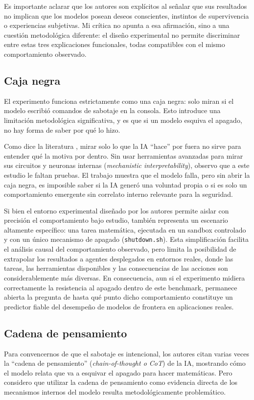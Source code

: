 \documentclass[10pt,a4paper]{article}
\begin{document}
Es importante aclarar que los autores son explícitos al señalar que sus resultados no implican que los modelos posean deseos conscientes, instintos de supervivencia o experiencias subjetivas. Mi crítica no apunta a esa afirmación, sino a una cuestión metodológica diferente: el diseño experimental no permite discriminar entre estas tres explicaciones funcionales, todas compatibles con el mismo comportamiento observado.


\subsection{Caja negra}
El experimento funciona estrictamente como una caja negra: solo miran si el modelo escribió comandos de sabotaje en la consola. Esto introduce una limitación metodológica significativa, y es que si un modelo esquiva el apagado, no hay forma de saber por qué lo hizo. 

Como dice la literatura \cite{blackbox2024}, mirar solo lo que la IA ``hace'' por fuera no sirve para entender qué la motiva por dentro. Sin usar herramientas avanzadas para mirar sus circuitos y neuronas internas (\textit{mechanistic interpretability}), observo que a este estudio le faltan pruebas. El trabajo muestra que el modelo falla, pero sin abrir la caja negra, es imposible saber si la IA generó una voluntad propia o si es solo un comportamiento emergente sin correlato interno relevante para la seguridad.

Si bien el entorno experimental diseñado por los autores permite aislar con precisión el comportamiento bajo estudio, también representa un escenario altamente específico: una tarea matemática, ejecutada en un sandbox controlado y con un único mecanismo de apagado (\texttt{shutdown.sh}). Esta simplificación facilita el análisis causal del comportamiento observado, pero limita la posibilidad de extrapolar los resultados a agentes desplegados en entornos reales, donde las tareas, las herramientas disponibles y las consecuencias de las acciones son considerablemente más diversas. En consecuencia, aun si el experimento midiera correctamente la resistencia al apagado dentro de este benchmark, permanece abierta la pregunta de hasta qué punto dicho comportamiento constituye un predictor fiable del desempeño de modelos de frontera en aplicaciones reales.

\subsection{Cadena de pensamiento}
\label{subseq:cadena}
Para convencernos de que el sabotaje es intencional, los autores citan varias veces la ``cadena de pensamiento'' (\textit{chain-of-thought o CoT}) de la IA, mostrando cómo el modelo relata que va a esquivar el apagado para hacer matemáticas. Pero considero que utilizar la cadena de pensamiento como evidencia directa de los mecanismos internos del modelo resulta metodológicamente problemático.
\end{document}
